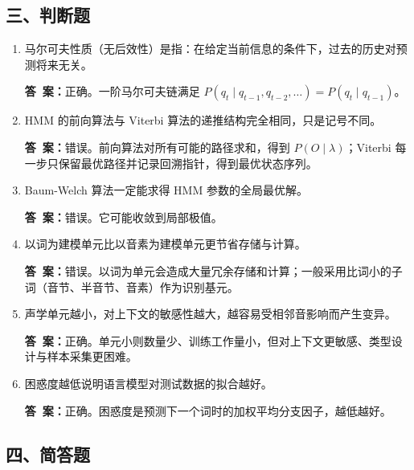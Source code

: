 \documentclass[10.5pt]{ctexart}
\newenvironment{qlist}
  {\begin{enumerate}[label={\sffamily\bfseries\color{accent}\arabic*.},leftmargin=2.4em,labelsep=0.55em,itemsep=0.62em,topsep=0.15em,parsep=0.3em,partopsep=0pt]}
  {\end{enumerate}}
\newcommand{\anslabel}{{\sffamily\bfseries\color{accent}答\ 案：}\hspace{0.35em}}
\newcommand{\ans}[1]{\par\vspace{2.15\baselineskip}\begin{ansbox}\anslabel #1\end{ansbox}}
\begin{document}
\subsection{三、判断题}

\begin{qlist}

\item 马尔可夫性质（无后效性）是指：在给定当前信息的条件下，过去的历史对预测将来无关。
\ans{正确。一阶马尔可夫链满足 $P(q_t\mid q_{t-1},q_{t-2},\dots)=P(q_t\mid q_{t-1})$。}

\item HMM 的前向算法与 Viterbi 算法的递推结构完全相同，只是记号不同。
\ans{错误。前向算法对所有可能的路径求和，得到 $P(O\mid\lambda)$；Viterbi 每一步只保留最优路径并记录回溯指针，得到最优状态序列。}

\item Baum-Welch 算法一定能求得 HMM 参数的全局最优解。
\ans{错误。它可能收敛到局部极值。}

\item 以词为建模单元比以音素为建模单元更节省存储与计算。
\ans{错误。以词为单元会造成大量冗余存储和计算；一般采用比词小的子词（音节、半音节、音素）作为识别基元。}

\item 声学单元越小，对上下文的敏感性越大，越容易受相邻音影响而产生变异。
\ans{正确。单元小则数量少、训练工作量小，但对上下文更敏感、类型设计与样本采集更困难。}

\item 困惑度越低说明语言模型对测试数据的拟合越好。
\ans{正确。困惑度是预测下一个词时的加权平均分支因子，越低越好。}

\end{qlist}

\subsection{四、简答题}
\end{document}
